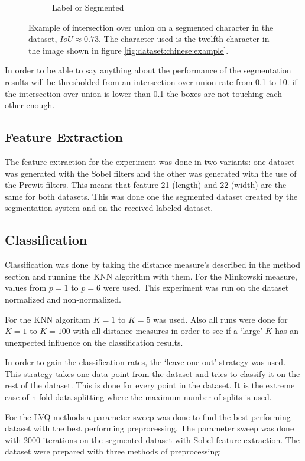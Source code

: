 \begin{figure}[ht]
\begin{subfigure}{0.24\textwidth}
    \caption{Label or Segmented}
    \label{fig:experiment:or}
  \end{subfigure}
  \caption{Example of intersection over union on a segmented character in the dataset, $IoU \approx 0.73$. The character used is the twelfth character in the image shown in figure \ref{fig:dataset:chinese:example}. }
  \label{fig:experiment:iou:example}
\end{figure}

In order to be able to say anything about the performance of the segmentation results will be thresholded from an intersection over union rate from 0.1 to 10. if the intersection over union is lower than 0.1 the boxes are not touching each other enough.


\subsection{Feature Extraction}

The feature extraction for the experiment was done in two variants: one dataset was generated with the Sobel filters and the other was generated with the use of the Prewit filters. This means that feature 21 (length) and 22 (width) are the same for both datasets. This was done one the segmented dataset created by the segmentation system and on the received labeled dataset.

\subsection{Classification}

Classification was done by taking the distance measure's described in the method section  and running the KNN algorithm with them. For the Minkowski measure, values from $p=1$ to $p=6$ were used. This experiment was run on the dataset normalized and non-normalized.

For the KNN algorithm $K=1$ to $K=5$ was used. Also all runs were done for $K=1$ to $K=100$ with all distance measures in order to see if a `large' $K$ has an unexpected influence on the classification results.

In order to gain the classification rates, the `leave one out' strategy was used. This strategy takes one data-point from the dataset and tries to classify it on the rest of the dataset. This is done for every point in the dataset. It is the extreme case of n-fold data splitting where the maximum number of splits is used.

For the LVQ methods a parameter sweep was done to find the best performing dataset with the best performing preprocessing. The parameter sweep was done with 2000 iterations on the segmented dataset with Sobel feature extraction. The dataset were prepared with three methods of preprocessing:

